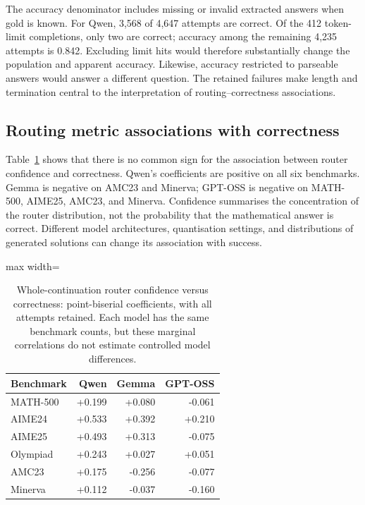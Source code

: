\documentclass[12pt,a4paper,twoside,openright]{book}
\begin{document}
The accuracy denominator includes missing or invalid extracted answers
when gold is known. For Qwen, 3,568 of 4,647 attempts are correct. Of the
412 token-limit completions, only two are correct; accuracy among the
remaining 4,235 attempts is 0.842. Excluding limit hits would therefore
substantially change the population and apparent accuracy. Likewise,
accuracy restricted to parseable answers would answer a different question.
The retained failures make length and termination central to the
interpretation of routing--correctness associations.

\subsection{Routing metric associations with correctness}

Table~\ref{tab:res-confidence} shows that there is no common sign for the
association between router confidence and correctness. Qwen's coefficients
are positive on all six benchmarks. Gemma is negative on AMC23 and Minerva;
GPT-OSS is negative on MATH-500, AIME25, AMC23, and Minerva. Confidence
summarises the concentration of the router distribution, not the probability
that the mathematical answer is correct. Different model architectures,
quantisation settings, and distributions of generated solutions can change
its association with success.

\begin{table}[!ht]
\centering\small
\caption{Whole-continuation router confidence versus correctness: point-biserial coefficients, with all attempts retained. Each model has the same benchmark counts, but these marginal correlations do not estimate controlled model differences.}
\label{tab:res-confidence}
\begin{adjustbox}{max width=\linewidth}%
\begin{tabular}{lrrr}
\toprule
Benchmark & Qwen & Gemma & GPT-OSS \\
\midrule
MATH-500 & +0.199 & +0.080 & -0.061 \\
AIME24 & +0.533 & +0.392 & +0.210 \\
AIME25 & +0.493 & +0.313 & -0.075 \\
Olympiad & +0.243 & +0.027 & +0.051 \\
AMC23 & +0.175 & -0.256 & -0.077 \\
Minerva & +0.112 & -0.037 & -0.160 \\
\bottomrule
\end{tabular}
\end{adjustbox}
\end{table}
\end{document}
